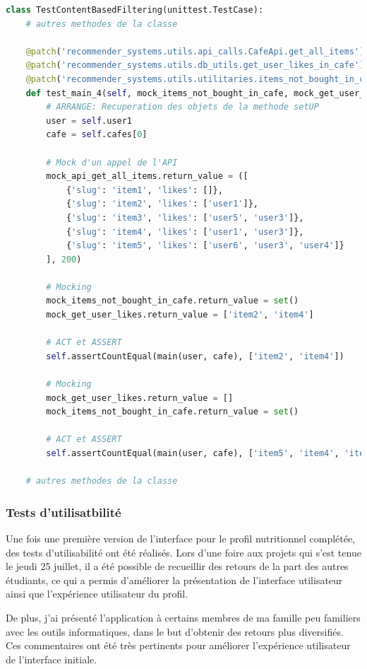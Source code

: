 \documentclass[11pt]{article}
\begin{document}
\begin{lstlisting}[language=Python, caption=Test unitaire test\_main\_4 content based filtering]
class TestContentBasedFiltering(unittest.TestCase):
    # autres methodes de la classe
    
    @patch('recommender_systems.utils.api_calls.CafeApi.get_all_items')
    @patch('recommender_systems.utils.db_utils.get_user_likes_in_cafe')
    @patch('recommender_systems.utils.utilitaries.items_not_bought_in_cafe')
    def test_main_4(self, mock_items_not_bought_in_cafe, mock_get_user_likes, mock_api_get_all_items):
        # ARRANGE: Recuperation des objets de la methode setUP
        user = self.user1
        cafe = self.cafes[0]

        # Mock d'un appel de l'API
        mock_api_get_all_items.return_value = ([
            {'slug': 'item1', 'likes': []}, 
            {'slug': 'item2', 'likes': ['user1']},
            {'slug': 'item3', 'likes': ['user5', 'user3']},
            {'slug': 'item4', 'likes': ['user1', 'user3']},
            {'slug': 'item5', 'likes': ['user6', 'user3', 'user4']}
        ], 200)

        # Mocking
        mock_items_not_bought_in_cafe.return_value = set()
        mock_get_user_likes.return_value = ['item2', 'item4']
        
        # ACT et ASSERT
        self.assertCountEqual(main(user, cafe), ['item2', 'item4'])

        # Mocking
        mock_get_user_likes.return_value = []
        mock_items_not_bought_in_cafe.return_value = set()

        # ACT et ASSERT
        self.assertCountEqual(main(user, cafe), ['item5', 'item4', 'item3', 'item2', 'item1'])

    # autres methodes de la classe
\end{lstlisting}

\subsubsection{Tests d'utilisatbilité}
Une fois une première version de l'interface pour le profil nutritionnel complétée, des tests d'utilisabilité ont été réalisés. Lors d'une foire aux projets qui s'est tenue le jeudi 25 juillet, il a été possible de recueillir des retours de la part des autres étudiants, ce qui a permis d'améliorer la présentation de l'interface utilisateur ainsi que l'expérience utilisateur du profil.\

De plus, j'ai présenté l'application à certains membres de ma famille peu familiers avec les outils informatiques, dans le but d'obtenir des retours plus diversifiés. Ces commentaires ont été très pertinents pour améliorer l'expérience utilisateur de l'interface initiale.\
\end{document}
